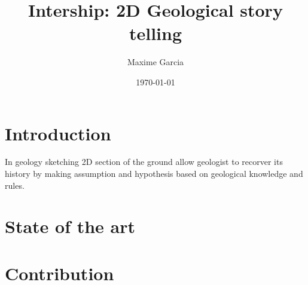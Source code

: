 \documentclass[a4paper,11pt]{article}
\title{Intership: 2D Geological story telling}
\author{Maxime Garcia}
\date{\today}
\begin{document}
\maketitle
\section{Introduction}

In geology sketching 2D section of the ground allow geologist to recorver its history by making assumption and hypothesis based on geological knowledge and rules. 

\section{State of the art}

\section{Contribution}
\end{document}
